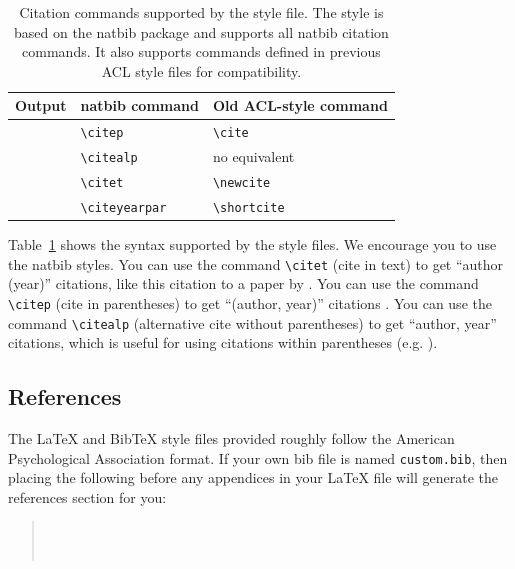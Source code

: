 \documentclass[11pt]{article}
\begin{document}
 \begin{table}
 \centering
 \begin{tabular}{lll}
 \hline
 \textbf{Output} & \textbf{natbib command} & \textbf{Old ACL-style command}\\
 \hline
 \citep{Gusfield:97} & \verb|\citep| & \verb|\cite| \\
 \citealp{Gusfield:97} & \verb|\citealp| & no equivalent \\
 \citet{Gusfield:97} & \verb|\citet| & \verb|\newcite| \\
 \citeyearpar{Gusfield:97} & \verb|\citeyearpar| & \verb|\shortcite| \\
 \hline
 \end{tabular}
 \caption{\label{citation-guide}
 Citation commands supported by the style file.
 The style is based on the natbib package and supports all natbib citation commands.
 It also supports commands defined in previous ACL style files for compatibility.
 }
 \end{table}

 Table~\ref{citation-guide} shows the syntax supported by the style files.
 We encourage you to use the natbib styles.
 You can use the command \verb|\citet| (cite in text) to get ``author (year)'' citations, like this citation to a paper by \citet{Gusfield:97}.
 You can use the command \verb|\citep| (cite in parentheses) to get ``(author, year)'' citations \citep{Gusfield:97}.
 You can use the command \verb|\citealp| (alternative cite without parentheses) to get ``author, year'' citations, which is useful for using citations within parentheses (e.g. \citealp{Gusfield:97}).

 \subsection{References}

 \nocite{Ando2005,borschinger-johnson-2011-particle,andrew2007scalable,rasooli-tetrault-2015,goodman-etal-2016-noise,harper-2014-learning}

 The \LaTeX{} and Bib\TeX{} style files provided roughly follow the American Psychological Association format.
 If your own bib file is named \texttt{custom.bib}, then placing the following before any appendices in your \LaTeX{} file will generate the references section for you:
 \begin{quote}
 \begin{verbatim}
 
 
 \end{verbatim}
 \end{quote}
\end{document}

